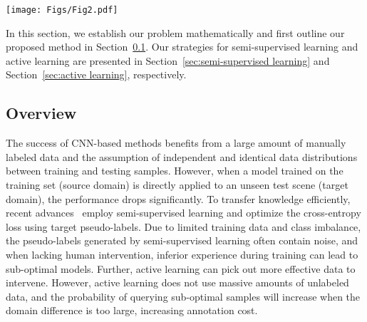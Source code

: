 \documentclass[journal]{IEEEtran}
\newcommand{\Sref}[1]{Section~\ref{#1}}
\newcommand{\method}{ILM-ASSL\xspace}
\newcommand{\ssl}{semi-supervised learning\xspace}
\begin{document}
\begin{figure*}[!thp]
  \centering
  \texttt{[image: Figs/Fig2.pdf]}
  \caption{{\bf The overview of the proposed \method.} The proposed framework consists of three stages: the first stage (a) is \ssl. Semi-supervised learning uses a very small amount of labeled data and a large amount of unlabeled data, resulting in a teacher model. The second stage (b) is active learning. A large amount of unlabeled target domain data is predicted by the teacher model, and the prediction results are sorted according to the uncertainty selection strategy of active learning, and then the corresponding number of prediction results and corresponding original images are selected according to the labeling budget. The third stage (c) is image labeling. Experts modify the labels of unreliable prediction results, add the modified samples to the labeled target data set, and repeat the first stage of semi-supervised learning to obtain the final model.}
  \label{fig2}
  \vspace{-4mm}
\end{figure*}


In this section, we establish our problem mathematically and first outline our proposed method in \Sref{sec:overview}. Our strategies for \ssl and active learning are presented in \Sref{sec:semi-supervised learning} and \Sref{sec:active learning}, respectively.

\subsection{Overview}
\label{sec:overview}

The success of CNN-based methods benefits from a large amount of manually labeled data and the assumption of independent and identical data distributions between training and testing samples. However, when a model trained on the training set (source domain) is directly applied to an unseen test scene (target domain), the performance drops significantly. To transfer knowledge efficiently, recent advances~\cite{saito2019semi, wang2020differential, chen2021semi} employ \ssl and optimize the cross-entropy loss using target pseudo-labels. Due to limited training data and class imbalance, the pseudo-labels generated by \ssl often contain noise, and when lacking human intervention, inferior experience during training can lead to sub-optimal models. Further, active learning can pick out more effective data to intervene. However, active learning does not use massive amounts of unlabeled data, and the probability of querying sub-optimal samples will increase when the domain difference is too large, increasing annotation cost.
\end{document}
